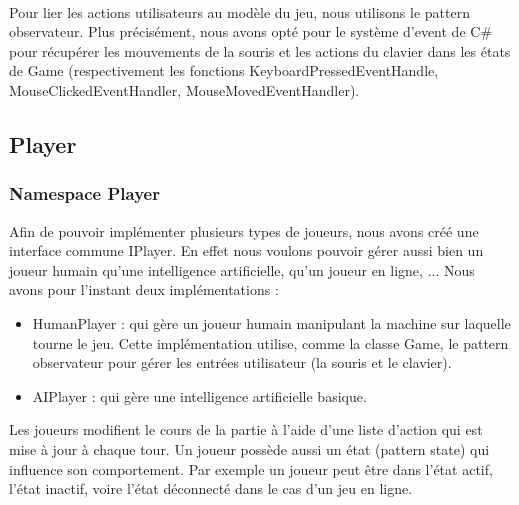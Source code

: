 				\paragraph{}
				Pour lier les actions utilisateurs au modèle du jeu, nous utilisons le pattern observateur. Plus précisément, nous avons opté pour le système d'event de C\#	pour récupérer les mouvements de la souris et les actions du clavier dans les états de Game (respectivement les fonctions KeyboardPressedEventHandle,  MouseClickedEventHandler, MouseMovedEventHandler).
			
			\subsection{Player}
				\subsubsection{Namespace Player}
				Afin de pouvoir implémenter plusieurs types de joueurs, nous avons créé une interface commune IPlayer. 
				En effet nous voulons pouvoir gérer aussi bien un joueur humain qu'une intelligence artificielle, qu'un joueur en ligne, ...
				Nous avons pour l'instant deux implémentations :
					\begin{itemize}
					\item HumanPlayer : qui gère un joueur humain manipulant la machine sur laquelle tourne le jeu. 
Cette implémentation utilise, comme la classe Game, le pattern observateur pour gérer les entrées utilisateur (la souris et le clavier).
					\item AIPlayer : qui gère une intelligence artificielle basique.
					\end{itemize}
Les joueurs modifient le cours de la partie à l'aide d'une liste d'action qui est mise à jour à chaque tour.
Un joueur possède aussi un état (pattern state) qui influence son comportement. Par exemple un joueur peut être dans l'état actif, l'état inactif,
voire l'état déconnecté dans le cas d'un jeu en ligne. 
					
